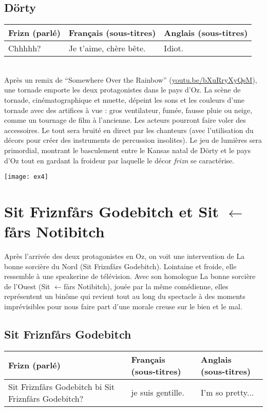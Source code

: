 \documentclass[a4paper]{article}
\newcommand{\mshrule}{}
\newcommand{\mssection}[1]{\section{#1}}
\begin{document}
\subsection*{Dörty}
\begin{center}
\begin{tabular}{|p{}|p{}|p{}|}\hline
Frizn (parlé) & Français (sous-titres) & Anglais (sous-titres) \\\hline
Chhhhh? &
Je t'aime, chère bête. &
Idiot.\\\hline
\end{tabular}
\end{center}\hfill\\
\mshrule
Après un \og{}remix\fg{} de ``Somewhere Over the Rainbow''
(\href{http://youtu.be/bXuRryXyQsM}{youtu.be/bXuRryXyQsM}), une tornade
emporte les deux protagonistes dans le pays d'Oz.
La scène de tornade, cinématographique et muette, dépeint les sons et les
couleurs d’une tornade avec des artifices à vue : gros ventilateur, fumée,
fausse pluie ou neige, comme un tournage de film à l’ancienne. Les acteurs
pourront faire voler des accessoires. Le tout sera bruité en direct par les
chanteurs (avec l’utilisation du décors pour créer des instruments de
percussion insolites).
Le jeu de lumières sera primordial,
montrant le basculement entre le Kansas natal de Dörty et le pays d'Oz tout
en gardant la froideur par laquelle le décor \emph{frizn} se caractérise.
\begin{center}
\texttt{[image: ex4]}
\end{center}
\mssection{Sit Friznfårs Godebitch et Sit $\leftarrow$fårs Notibitch}
Après l'arrivée des deux protagonistes en Oz, on voit
une intervention de La bonne sorcière du Nord (Sit Friznfårs Godebitch).
Lointaine et froide, elle ressemble à une speakerine de télévision. Avec
son homologue La bonne sorcière de l'Ouest (Sit $\leftarrow$fårs Notibitch),
jouée par la même comédienne,
elles représentent un binôme qui revient tout au long du spectacle à des
moments imprévisibles pour nous faire part d'une morale creuse sur
le bien et le mal.
\mshrule
\subsection*{Sit Friznfårs Godebitch}
\begin{center}
\begin{tabular}{|p{}|p{}|p{}|}\hline
Frizn (parlé) & Français (sous-titres) & Anglais (sous-titres) \\\hline
Sit Friznfårs Godebitch bi Sit Friznfårs Godebitch? &
je suis gentille. &
I'm so pretty... \\\hline
\end{tabular}
\end{center}\par
\end{document}

